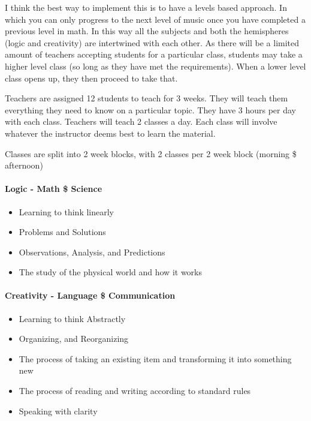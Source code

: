 \documentclass[CSHFoundation.tex]{subfiles}
\begin{document}
I think the best way to implement this is to have a levels based approach. In which you can only progress to the next level of music once you have completed a previous level in math. In this way all the subjects and both the hemispheres (logic and creativity) are intertwined with each other. As there will be a limited amount of teachers accepting students for a particular class, students may take a higher level class (so long as they have met the requirements). When a lower level class opens up, they then proceed to take that.



Teachers are assigned 12 students to teach for 3 weeks. They will teach them everything they need to know on a particular topic. They have 3 hours per day with each class. Teachers will teach 2 classes a day. Each class will involve whatever the instructor deems best to learn the material.



Classes are split into 2 week blocks, with 2 classes per 2 week block (morning \$ afternoon)



\paragraph{Logic - Math \$ Science}

\begin{itemize}
\item Learning to think linearly
\item Problems and Solutions
\item Observations, Analysis, and Predictions
\item The study of the physical world and how it works
\end{itemize}

\paragraph{Creativity - Language \$ Communication}

\begin{itemize}
\item Learning to think Abstractly
\item Organizing, and Reorganizing
\item The process of taking an existing item and transforming it into something new
\item The process of reading and writing according to standard rules
\item Speaking with clarity
\end{itemize}
\end{document}

